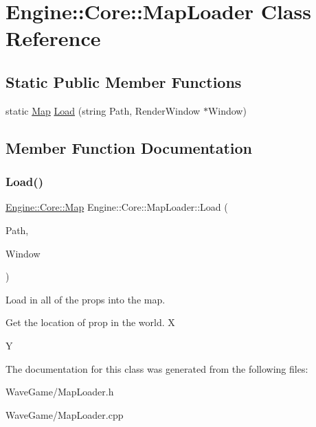 \hypertarget{class_engine_1_1_core_1_1_map_loader}{}\section{Engine\+:\+:Core\+:\+:Map\+Loader Class Reference}
\label{class_engine_1_1_core_1_1_map_loader}
\subsection*{Static Public Member Functions}
\begin{DoxyCompactItemize}
\item 
static \hyperlink{class_engine_1_1_core_1_1_map}{Map} \hyperlink{class_engine_1_1_core_1_1_map_loader_a32e2582da2a0173435e6508c3b23434b}{Load} (string Path, Render\+Window $\ast$Window)
\end{DoxyCompactItemize}


\subsection{Member Function Documentation}
\mbox{\label{class_engine_1_1_core_1_1_map_loader_a32e2582da2a0173435e6508c3b23434b}} 
\subsubsection{\texorpdfstring{Load()}{Load()}}
{\footnotesize\ttfamily \hyperlink{class_engine_1_1_core_1_1_map}{Engine\+::\+Core\+::\+Map} Engine\+::\+Core\+::\+Map\+Loader\+::\+Load (\begin{DoxyParamCaption}\item[{string}]{Path,  }\item[{Render\+Window $\ast$}]{Window }\end{DoxyParamCaption})\hspace{0.3cm}{\ttfamily [static]}}

Load in all of the props into the map.

Get the location of prop in the world. X

Y 

The documentation for this class was generated from the following files\+:\begin{DoxyCompactItemize}
\item 
Wave\+Game/Map\+Loader.\+h\item 
Wave\+Game/Map\+Loader.\+cpp\end{DoxyCompactItemize}
